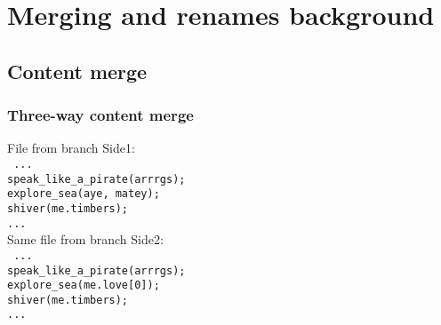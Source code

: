 \documentclass[compress,t]{beamer}
\begin{document}
\section[Background]{Merging and renames background}

\subsection{Content merge}

\begin{frame}
  \frametitle{Three-way content merge}

  \vspace*{-\baselineskip}
  \begin{multicols}{2}
    File from branch Side1:\\
    {\footnotesize\texttt{%
    \quad{}...                             \\
    \quad{}speak\_like\_a\_pirate(arrrgs); \\
    \quad{}explore\_sea(aye, matey);\\
    \quad{}shiver(me.timbers);             \\
    \quad{}...                             \\
    }}
    \columnbreak
    \pause
    Same file from branch Side2:\\
    {\footnotesize\texttt{%
    \quad{}...                             \\
    \quad{}speak\_like\_a\_pirate(arrrgs); \\
    \quad{}explore\_sea(me.love[0]);\\
    \quad{}shiver(me.timbers);             \\
    \quad{}...
    }}
  \end{multicols}%



\end{frame}
\end{document}
